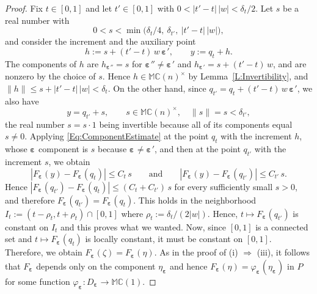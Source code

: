 \documentclass[12pt]{amsart}
\theoremstyle{plain}
\theoremstyle{definition}
\numberwithin{equation}{section}
\newcommand{\bep}[1]{\bm{\varepsilon_{#1}}}
\newcommand{\mC}{\mathbb{C}}
\newcommand{\mM}{\mathbb{M}}
\newcommand{\ra}{\rightarrow}
\newcommand{\Ra}{\Rightarrow}
\begin{document}
\begin{proof}
    Fix $t \in [ 0 , 1 ]$ and let $t ' \in [ 0 , 1 ]$ with
    $0 < | t ' - t |\, | w | < \delta_t / 2$. Let $s$ be a real number with
        \[
        0 < s < \min \big( \delta_t / 4 ,\ \delta_{t '} ,\
        | t ' - t |\, | w | \big) ,
        \]
    and consider the increment and the auxiliary point
        \[
        h := s + ( t ' - t )\, w\, \bep{}' , \qquad y := q_t + h .
        \]
    The components of $h$ are $h_{\bep{}''} = s$ for $\bep{}'' \neq \bep{}'$ and
    $h_{\bep{}'} = s + ( t ' - t )\, w$, and are nonzero by the choice of $s$. Hence $h \in \mM \mC(n)^\times$ by
    Lemma~\ref{L:Invertibility}, and
    $\| h \| \leq s + | t ' - t |\, | w | < \delta_t$. On the other hand,
    since $q_{t '} = q_t + ( t ' - t )\, w\, \bep{}'$, we also have
        \[
        y = q_{t '} + s , \qquad s \in \mM \mC(n)^\times , \quad
        \| s \| = s < \delta_{t '} ,
        \]
    the real number $s = s \cdot 1$ being invertible because all of its
    components equal $s \neq 0$. Applying \eqref{Eq:ComponentEstimate} at the
    point $q_t$ with the increment $h$, whose $\bep{}$ component is $s$ because
    $\bep{} \neq \bep{}'$, and then at the point $q_{t '}$ with the increment $s$, we
    obtain
        \[
        | F_{\bep{}} ( y ) - F_{\bep{}} ( q_t ) | \leq C_t\, s
        \qquad \text{and} \qquad
        | F_{\bep{}} ( y ) - F_{\bep{}} ( q_{t '} ) | \leq C_{t '}\, s .
        \]
    Hence $| F_{\bep{}} ( q_{t '} ) - F_{\bep{}} ( q_t ) | \leq ( C_t + C_{t '} )\, s$ for
    every sufficiently small $s > 0$, and therefore
    $F_{\bep{}} ( q_{t '} ) = F_{\bep{}} ( q_t )$. This holds in the neighborhood $I_t := (t - \rho_t , t + \rho_t) \cap [0, 1]$ where $\rho_t := \delta_t / (2 |w| )$. Hence, $t\mapsto F_{\bep{}}(q_{t'})$ is constant on $I_t$ and this proves what we wanted. Now, since $[0, 1]$ is a connected set and $t \mapsto F_{\bep{}} ( q_t )$ is locally constant, it must be constant on $[0, 1]$. Therefore, we obtain $F_{\bep{}} ( \zeta ) = F_{\bep{}} ( \eta )$. As in the proof of (i) $\Ra$ (iii), it follows that $F_{\bep{}}$ depends only on the component $\eta_{\bep{}}$ and hence $F_{\bep{}} ( \eta ) = \varphi_{\bep{}} ( \eta_{\bep{}} )$ in $P$ for some function $\varphi_{\bep{}} : D_{\bep{}} \ra \mM \mC(1)$.


\end{proof}
\end{document}
